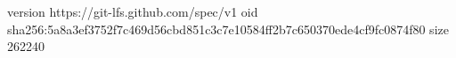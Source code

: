 version https://git-lfs.github.com/spec/v1
oid sha256:5a8a3ef3752f7c469d56cbd851c3c7e10584ff2b7c650370ede4cf9fc0874f80
size 262240
